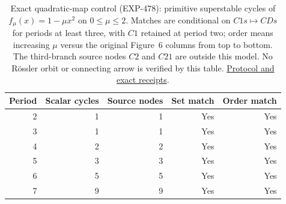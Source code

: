 \begin{table}[htbp]
\centering
\small
\begin{tabular}{rrrrr}
\toprule
Period & Scalar cycles & Source nodes & Set match & Order match \\
\midrule
2 & 1 & 1 & Yes & Yes \\
3 & 1 & 1 & Yes & Yes \\
4 & 2 & 2 & Yes & Yes \\
5 & 3 & 3 & Yes & Yes \\
6 & 5 & 5 & Yes & Yes \\
7 & 9 & 9 & Yes & Yes \\
\bottomrule
\end{tabular}
\caption{Exact quadratic-map control (EXP-478): primitive superstable cycles of $f_\mu(x)=1-\mu x^2$ on $0\leq\mu\leq2$. Matches are conditional on $C1s\mapsto CDs$ for periods at least three, with $C1$ retained at period two; order means increasing $\mu$ versus the original Figure~6 columns from top to bottom. The third-branch source nodes $C2$ and $C21$ are outside this model. No R\"ossler orbit or connecting arrow is verified by this table. \href{https://github.com/tdj28/butterfly/blob/main/docs/experiments/EXP-478-quadratic-symbolic-control.md}{Protocol and exact receipts}.}
\label{tab:quadratic-symbolic-control}
\end{table}
